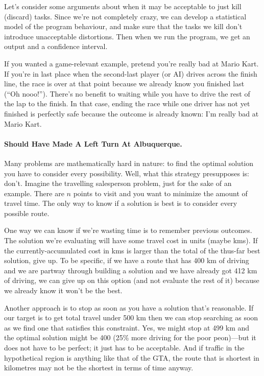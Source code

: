 Let's consider some arguments about when it may be acceptable to just
kill (discard) tasks. Since we're not completely crazy, we can develop
a statistical model of the program behaviour, and make sure that the
tasks we kill don't introduce unacceptable distortions. Then when we
run the program, we get an output and a confidence interval.

If you wanted a game-relevant example, pretend you're really bad at Mario Kart. If you're in last place when the second-last player (or AI) drives across the finish line, the race is over at that point because we already know you finished last (``Oh nooo!''). There's no benefit to waiting while you have to drive the rest of the lap to the finish. In that case, ending the race while one driver has not yet finished is perfectly safe because the outcome is already known: I'm really bad at Mario Kart.

\paragraph{Should Have Made A Left Turn At Albuquerque.} 
Many problems are mathematically hard in nature: to find the optimal solution you have to consider every possibility. Well, what this strategy presupposes is: don't. Imagine the travelling salesperson problem, just for the sake of an example. There are $n$ points to visit and you want to minimize the amount of travel time. The only way to know if a solution is best is to consider every possible route.

One way we can know if we're wasting time is to remember previous outcomes. The solution we're evaluating will have some travel cost in units (maybe kms). If the currently-accumulated cost in kms is larger than the total of the thus-far best solution, give up. To be specific, if we have a route that has 400 km of driving and we are partway through building a solution and we have already got 412 km of driving, we can give up on this option (and not evaluate the rest of it) because we already know it won't be the best.

Another approach is to stop as soon as you have a solution that's reasonable. If our target is to get total travel under 500 km then we can stop searching as soon as we find one that satisfies this constraint. Yes, we might stop at 499 km and the optimal solution might be 400 (25\% more driving for the poor peon)---but it does not have to be perfect; it just has to be acceptable. And if traffic in the hypothetical region is anything like that of the GTA, the route that is shortest in kilometres may not be the shortest in terms of time anyway.

